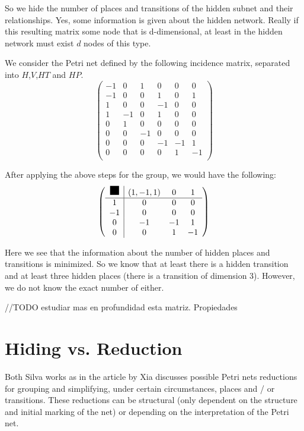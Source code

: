 {So we hide the number of places and transitions of the hidden subnet
and their relationships.
Yes, some information is given about the hidden network. Really if this resulting matrix some node that is d-dimensional, at least in the hidden network must exist $ d $ nodes of this type.
\begin{example}
We consider the Petri net defined by the following incidence matrix, separated into $H$,$V$,$HT$ and $HP$.
\[
\left(
\begin{array}{ccc|ccc}
-1 & 0 & 1 & 0 & 0 & 0\\
-1 & 0 & 0 & 1 & 0 & 1\\
1 & 0 & 0 & -1 & 0 & 0\\
1 & -1 & 0 & 1 & 0 & 0\\
\hline
0 & 1 & 0 & 0 & 0 & 0\\
0 & 0 & -1 & 0 & 0 & 0\\
0 & 0 & 0 & -1 & -1 & 1\\
0 & 0 & 0 & 0 & 1 & -1\\
\end{array}
\right)
\]

After applying the above steps for the group, we would have the following:
\[
\left(
\begin{array}{c|ccc}
\rule{0.15in}{0.15in} & (1,-1,1) & 0 & 1\\
\hline
1  & 0 & 0 & 0\\
-1 & 0 & 0 & 0\\
0 &  -1 & -1 & 1\\
0 &  0 & 1 & -1\\
\end{array}
\right)
\]

Here we see that the information about the number of hidden places and transitions is minimized. So we know that at least there is a hidden transition and at least three hidden places (there is a transition of dimension 3). However, we do not know the exact number of either.
\end{example}

//TODO estudiar mas en profundidad esta matriz. Propiedades

\section{Hiding vs. Reduction}

Both Silva works \cite{silva} \cite{silva2} as in the article by Xia \cite{xia} discusses possible Petri nets reductions for grouping and simplifying, under certain circumstances, places and / or transitions. These reductions can be structural (only dependent on the structure and initial marking of the net) or depending on the interpretation of the Petri net.

}
